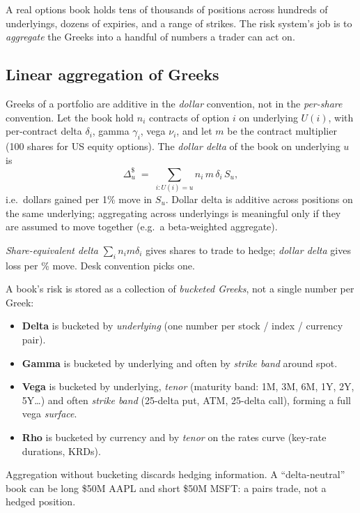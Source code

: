 A real options book holds tens of thousands of positions across
hundreds of underlyings, dozens of expiries, and a range of strikes.
The risk system's job is to \emph{aggregate} the Greeks into a
handful of numbers a trader can act on.

\subsection{Linear aggregation of Greeks}

Greeks of a portfolio are additive in the \emph{dollar} convention,
not in the \emph{per-share} convention.  Let the book hold $n_i$
contracts of option $i$ on underlying $U(i)$, with per-contract
delta $\delta_i$, gamma $\gamma_i$, vega $\nu_i$, and let $m$ be the
contract multiplier (100 shares for US equity options).  The
\emph{dollar delta} of the book on underlying $u$ is
\[
  \Delta^\$_u \;=\; \sum_{i : U(i) = u} n_i \, m \, \delta_i \, S_u,
\]
i.e.\ dollars gained per 1\% move in $S_u$.  Dollar delta is
additive across positions on the same underlying; aggregating
across underlyings is meaningful only if they are assumed to move
together (e.g.\ a beta-weighted aggregate).

\emph{Share-equivalent delta} $\sum_i n_i m \delta_i$ gives shares
to trade to hedge; \emph{dollar delta} gives loss per \% move.
Desk convention picks one.

\begin{keyfactbox}
A book's risk is stored as a collection of \emph{bucketed Greeks},
not a single number per Greek:
\begin{itemize}
  \item \textbf{Delta} is bucketed by \emph{underlying} (one number
    per stock / index / currency pair).
  \item \textbf{Gamma} is bucketed by underlying and often by
    \emph{strike band} around spot.
  \item \textbf{Vega} is bucketed by underlying, \emph{tenor}
    (maturity band: 1M, 3M, 6M, 1Y, 2Y, 5Y\ldots) and often
    \emph{strike band} (25-delta put, ATM, 25-delta call), forming a
    full vega \emph{surface}.
  \item \textbf{Rho} is bucketed by currency and by \emph{tenor} on
    the rates curve (key-rate durations, KRDs).
\end{itemize}
Aggregation without bucketing discards hedging information.  A
``delta-neutral'' book can be long \$50M AAPL and short \$50M MSFT:
a pairs trade, not a hedged position.
\end{keyfactbox}


